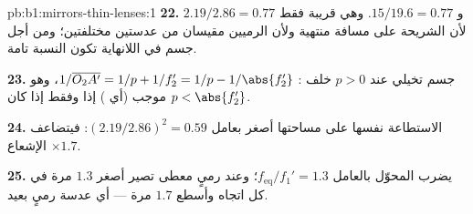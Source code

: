 \begin{solution}{pb:b1:mirrors-thin-lenses:1}
\textbf{22.} $2.19/2.86 = 0.77$ و $15/19.6 = 0.77$. وهي قريبة فقط
لأن الشريحة على مسافة منتهية ولأن الرميين مقيسان
من عدستين مختلفتين؛ ومن أجل جسم في اللانهاية تكون النسبة
تامة.

\textbf{23.} جسم تخيلي عند $p > 0$ خلف :
$1/\overline{O_2A'} = 1/p + 1/f_2' = 1/p - 1/\abs{f_2'}$، وهو موجب (أي ) إذا وفقط إذا كان $p < \abs{f_2'}$.

\textbf{24.} الاستطاعة نفسها على  مساحتها أصغر بعامل $(2.19/2.86)^2 = 0.59$:
فيتضاعف الإشعاع $\times 1.7$.

\textbf{25.} يضرب المحوّل  بالعامل
$f_{\mathrm{eq}}/f_1' = 1.3$؛ وعند رميٍ معطى تصير  أصغر $1.3$
مرة في كل اتجاه وأسطع $1.7$ مرة --- أي عدسة رميٍ
بعيد.
\end{solution}
